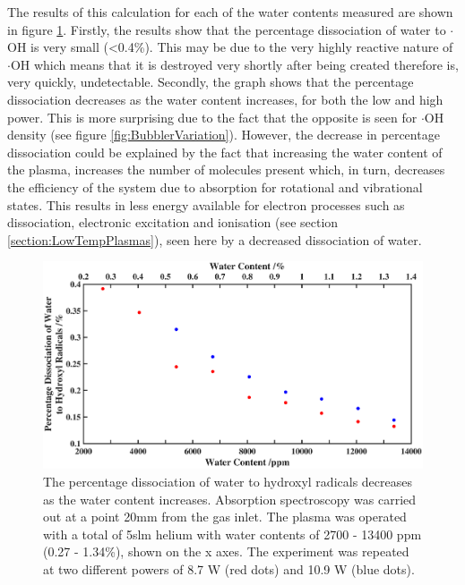 \documentclass[11pt, oneside]{article}   	%
\begin{document}
The results of this calculation for each of the water contents measured are shown in figure \ref{fig:BubblerDissociation}.
Firstly, the results show that the percentage dissociation of water to $\cdot$OH is very small (\textless 0.4\%). This may be due to the very highly reactive nature of $\cdot$OH which means that it is destroyed very shortly after being created therefore is, very quickly, undetectable.
Secondly, the graph shows that the percentage dissociation decreases as the water content increases, for both the low and high power.
This is more surprising due to the fact that the opposite is seen for $\cdot$OH density (see figure \ref{fig:BubblerVariation}).
However, the decrease in percentage dissociation could be explained by the fact that increasing the water content of the plasma, increases the number of molecules present which, in turn, decreases the efficiency of the system due to absorption for rotational and vibrational states.
This results in less energy available for electron processes such as dissociation, electronic excitation and ionisation (see section \ref{section:LowTempPlasmas}), seen here by a decreased dissociation of water.





\begin{figure}
    \centering
    \includegraphics[width=\textwidth]{Figures/WaterDissociation2.eps}
    \caption{The percentage dissociation of water to hydroxyl radicals decreases as the water content increases. Absorption spectroscopy was carried out at a point 20mm from the gas inlet. The plasma was operated with a total of 5slm helium with water contents of 2700 - 13400 ppm (0.27 - 1.34\%), shown on the x axes. The experiment was repeated at two different powers of 8.7 W (red dots) and 10.9 W (blue dots).}
    \label{fig:BubblerDissociation}
\end{figure}
\end{document}
